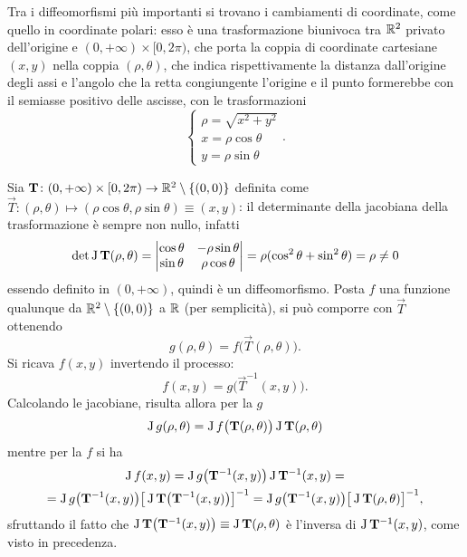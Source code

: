 Tra i diffeomorfismi più importanti si trovano i cambiamenti di coordinate, come quello in coordinate polari: esso è una trasformazione biunivoca tra $\mathbb{R}^2$ privato dell'origine e $(0,+\infty)\times[0,2\pi)$, che porta la coppia di coordinate cartesiane $(x,y)$ nella coppia $(\rho,\theta)$, che indica rispettivamente la distanza dall'origine degli assi e l'angolo che la retta congiungente l'origine e il punto formerebbe con il semiasse positivo delle ascisse, con le trasformazioni
\begin{equation}
\begin{cases}
\rho=\sqrt{x^2+y^2}\\
x=\rho\cos\theta\\
y=\rho\sin\theta
\end{cases}.
\end{equation}

Sia $\mathbf{T}\colon(0,+\infty)\times[0,2\pi)\to\mathbb{R}^2\setminus\{(0,0)\}$ definita come $\vec T\colon(\rho,\theta)\mapsto(\rho\cos\theta,\rho\sin\theta)\equiv(x,y)$: il determinante della jacobiana della trasformazione è sempre non nullo, infatti
\[
\det\operatorname{J}\mathbf{T}(\rho,\theta)=
	\begin{vmatrix}
	\cos\theta	&-\rho\sin\theta\\
	\sin\theta	&\rho\cos\theta
	\end{vmatrix}
=\rho(\cos^2\theta+\sin^2\theta)=\rho\neq 0
\]
essendo definito in $(0,+\infty)$, quindi è un diffeomorfismo.
Posta $f$ una funzione qualunque da $\mathbb{R}^2\setminus\{(0,0)\}$ a $\mathbb{R}$ (per semplicità), si può comporre con $\vec T$ ottenendo
\[
g(\rho,\theta)=f\big(\vec T(\rho,\theta)\big).
\]
Si ricava $f(x,y)$ invertendo il processo:
\[
f(x,y)=g\big(\vec T^{-1}(x,y)\big).
\]
Calcolando le jacobiane, risulta allora per la $g$
\begin{equation} \label{eq:composizione_jacobiane_polari1}
\operatorname{J} g(\rho,\theta)=\operatorname{J} f\big(\mathbf{T}(\rho,\theta)\big)\operatorname{J}\mathbf{T}(\rho,\theta)
\end{equation}
mentre per la $f$ si ha
\begin{multline} \label{eq:composizione_jacobiane_polari2}
\operatorname{J} f(x,y)=\operatorname{J} g\big(\mathbf{T}^{-1}(x,y)\big)\operatorname{J}\mathbf{T}^{-1}(x,y)=\\
=\operatorname{J} g\big(\mathbf{T}^{-1}(x,y)\big)\big[\operatorname{J}\mathbf{T}\big(\mathbf{T}^{-1}(x,y)\big)\big]^{-1}=\operatorname{J} g\big(\mathbf{T}^{-1}(x,y)\big)\big[\operatorname{J}\mathbf{T}(\rho,\theta)\big]^{-1},
\end{multline}
sfruttando il fatto che $\operatorname{J}\mathbf{T}\big(\mathbf{T}^{-1}(x,y)\big)\equiv\operatorname{J}\mathbf{T}(\rho,\theta)$ è l'inversa di $\operatorname{J}\mathbf{T}^{-1}(x,y)$, come visto in precedenza.

